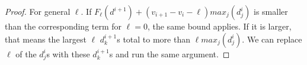 \documentclass[10pt,a4paper]{amsart}
\begin{document}
\begin{proof}
For general $\ell$. If $F_\ell(d^{i+1})+(v_{i+1}-v_i-\ell)max_j(d^i_j)$ is smaller than the corresponding term for $\ell=0$, the same bound applies. If it is larger, that means the largest $\ell$ $d^{i+1}_k$s total to more than $\ell max_j(d^i_j)$. We can replace $\ell$ of the $d^i_j$s with these $d^{i+1}_k$s and run the same argument.  




\end{proof}
\end{document}
